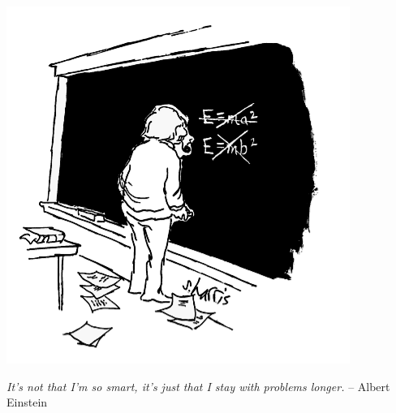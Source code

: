\documentclass[12pt]{zettel}
\begin{document}
\begin{center}
  \includegraphics[scale=0.4]{einstein}

  \emph{It's not that I'm so smart, it's just that I stay with problems
  longer.}
  -- Albert Einstein
\end{center}
\end{document}
